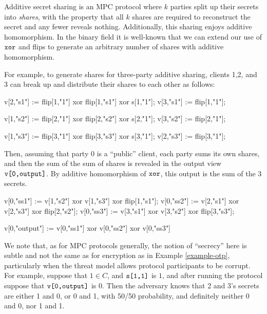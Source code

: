 \begin{example}
    \label{example-he}
Additive secret sharing is an MPC protocol where $k$ parties split up
their secrets into \emph{shares}, with the property that all $k$
shares are required to reconstruct the secret and any fewer reveals
nothing. Additionally, this sharing enjoys additive homomorphism. In
the binary field it is well-known that we can extend our use
of $\texttt{xor}$ and flips to generate an arbitrary number of shares
with additive homomorphism. 

For example, to generate shares for three-party additive sharing,
clients 1,2, and 3 can break up and distribute their shares to
each other as follows:
\begin{verbatimtab}
  v[2,"s1"] := flip[1,"1"] xor flip[1,"s1"] xor s[1,"1"];
  v[3,"s1"] := flip[1,"1"];

  v[1,"s2"] := flip[2,"1"] xor flip[2,"s2"] xor s[2,"1"];
  v[3,"s2"] := flip[2,"1"];

  v[1,"s3"] := flip[3,"1"] xor flip[3,"s3"] xor s[3,"1"];
  v[2,"s3"] := flip[3,"1"];
\end{verbatimtab}
Then, assuming that party 0 is a ``public'' client, each party sums
its own shares, and then the sum of the sum of shares is revealed
in the output view $\texttt{v[0,output]}$. By additive homomorphism of
$\texttt{xor}$, this output is the sum of the 3 secrets.
\begin{verbatimtab}
  v[0,"ss1"] := v[1,"s2"] xor v[1,"s3"] xor flip[1,"s1"];
  v[0,"ss2"] := v[2,"s1"] xor v[2,"s3"] xor flip[2,"s2"];
  v[0,"ss3"] := v[3,"s1"] xor v[3,"s2"] xor flip[3,"s3"];

  v[0,"output"] := v[0,"ss1"] xor v[0,"ss2"] xor v[0,"ss3"]
\end{verbatimtab}
We note that, as for MPC protocols generally, the notion of
``secrecy'' here is subtle and not the same as for encryption as in
Example \ref{example-otp}, particularly when the threat model allows
protocol participants to be corrupt. For example, suppose that $1 \in C$, and
$\texttt{s[1,1]}$ is $1$, and after running the protocol suppose that
$\texttt{v[0,output]}$ is 0. Then the adversary knows that 2 and 3's secrets
are either 1 and 0, or 0 and 1, with 50/50 probability, and definitely
neither 0 and 0, nor 1 and 1. 
\end{example}


